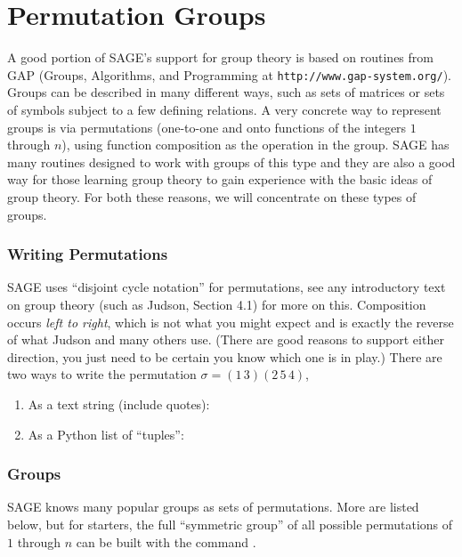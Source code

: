 \documentclass[12pt]{article}
\newcommand{\sageinline}[1]{\lit*{#1}}
\newcommand{\sagetopic}[1]{\subsubsection*{#1}}
\begin{document}
\section*{Permutation Groups}
%
A good portion of SAGE's support for group theory is based on routines from GAP (Groups, Algorithms, and Programming at {\tt http://www.gap-system.org/}).  Groups can be described in many different ways, such as sets of matrices or sets of symbols subject to a few defining relations.  A very concrete
way to represent groups is via permutations (one-to-one and onto functions of the integers $1$ through $n$), using function composition as the operation in the group.  SAGE has many routines designed to work with groups of this type and they are also a good way for those learning group theory to gain experience with the basic ideas of group theory.  For both these reasons, we will concentrate on these types of groups.
%
%
\sagetopic{Writing Permutations}  SAGE uses ``disjoint cycle notation'' for permutations, see any introductory text on group theory (such as Judson, Section 4.1) for more on this.  Composition occurs {\em left to right}, which is not what you might expect and is exactly the reverse of what Judson and many others use.  (There are good reasons to support either direction, you just need to be certain you know which one is in play.)  There are two ways to write the permutation $\sigma=(1\,3)(2\,5\,4)$,
%
\begin{enumerate}
\item As a text string (include quotes): \sageinline{"(1,3)(2,5,4)"}
\item As a Python list of ``tuples'': \sageinline{[(1,3), (2,5,4)]}
\end{enumerate}
%
%
\sagetopic{Groups}  SAGE knows many popular groups as sets of permutations.  More are listed below, but for starters, the full ``symmetric group'' of all possible permutations of $1$ through $n$ can be built with the command 
\sageinline{SymmetricGroup(n)}.
%
\end{document}
